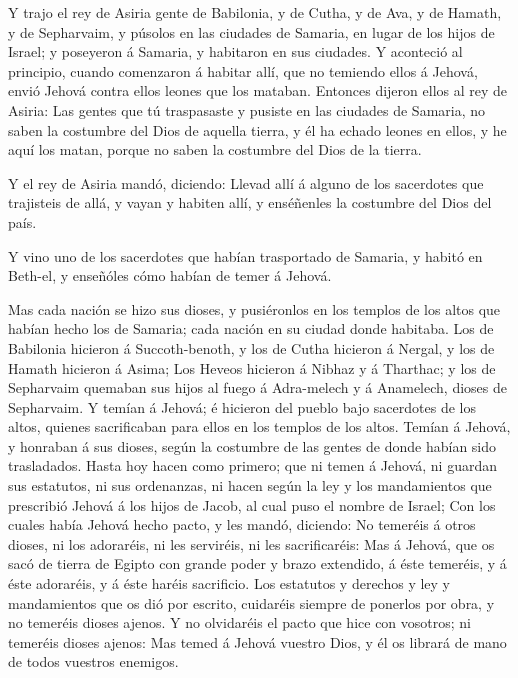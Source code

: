  Y trajo el rey de Asiria gente de Babilonia, y de Cutha, y
de Ava, y de Hamath, y de Sepharvaim, y púsolos en las ciudades de
Samaria, en lugar de los hijos de Israel; y poseyeron á Samaria, y
habitaron en sus ciudades.  Y aconteció al principio,
cuando comenzaron á habitar allí, que no temiendo ellos á Jehová, envió
Jehová contra ellos leones que los mataban.  Entonces
dijeron ellos al rey de Asiria: Las gentes que tú traspasaste y pusiste
en las ciudades de Samaria, no saben la costumbre del Dios de aquella
tierra, y él ha echado leones en ellos, y he aquí los matan, porque no
saben la costumbre del Dios de la tierra.

 Y el rey de Asiria mandó, diciendo: Llevad allí á alguno
de los sacerdotes que trajisteis de allá, y vayan y habiten allí, y
enséñenles la costumbre del Dios del país.

 Y vino uno de los sacerdotes que habían trasportado de
Samaria, y habitó en Beth-el, y enseñóles cómo habían de temer á Jehová.

 Mas cada nación se hizo sus dioses, y pusiéronlos en los
templos de los altos que habían hecho los de Samaria; cada nación en su
ciudad donde habitaba.  Los de Babilonia hicieron á
Succoth-benoth, y los de Cutha hicieron á Nergal, y los de Hamath
hicieron á Asima;  Los Heveos hicieron á Nibhaz y á
Tharthac; y los de Sepharvaim quemaban sus hijos al fuego á Adra-melech
y á Anamelech, dioses de Sepharvaim.  Y temían á Jehová; é
hicieron del pueblo bajo sacerdotes de los altos, quienes sacrificaban
para ellos en los templos de los altos.  Temían á Jehová, y
honraban á sus dioses, según la costumbre de las gentes de donde habían
sido trasladados.  Hasta hoy hacen como primero; que ni
temen á Jehová, ni guardan sus estatutos, ni sus ordenanzas, ni hacen
según la ley y los mandamientos que prescribió Jehová á los hijos de
Jacob, al cual puso el nombre de Israel;  Con los cuales
había Jehová hecho pacto, y les mandó, diciendo: No temeréis á otros
dioses, ni los adoraréis, ni les serviréis, ni les sacrificaréis:
 Mas á Jehová, que os sacó de tierra de Egipto con grande
poder y brazo extendido, á éste temeréis, y á éste adoraréis, y á éste
haréis sacrificio.  Los estatutos y derechos y ley y
mandamientos que os dió por escrito, cuidaréis siempre de ponerlos por
obra, y no temeréis dioses ajenos.  Y no olvidaréis el
pacto que hice con vosotros; ni temeréis dioses ajenos: 
Mas temed á Jehová vuestro Dios, y él os librará de mano de todos
vuestros enemigos.

